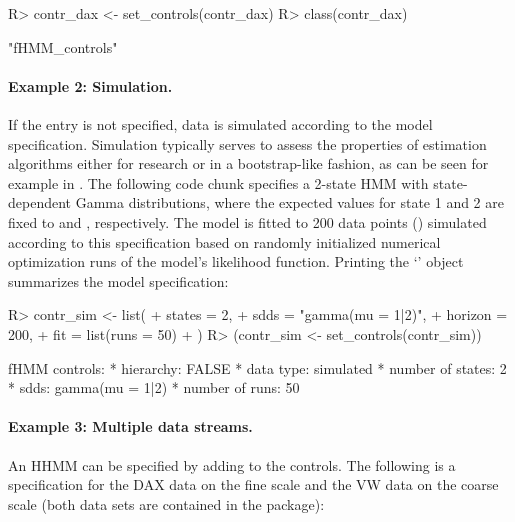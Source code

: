\documentclass[article]{jss}
\newcommand{\class}[1]{`\code{#1}'}
\begin{document}
%
\begin{Schunk}
\begin{Sinput}
R> contr_dax <- set_controls(contr_dax)
R> class(contr_dax)
\end{Sinput}
\begin{Soutput}
[1] "fHMM_controls"
\end{Soutput}
\end{Schunk}
%

\paragraph{Example 2: Simulation.} If the  entry is not specified, data is simulated according to the model specification. Simulation typically serves to assess the properties of estimation algorithms either for research or in a bootstrap-like fashion, as can be seen for example in \cite{oel19}. The following code chunk specifies a 2-state HMM with state-dependent Gamma distributions, where the expected values for state 1 and 2 are fixed to  and , respectively. The model is fitted to 200 data points () simulated according to this specification based on  randomly initialized numerical optimization runs of the model's likelihood function. Printing the \class{fHMM\_controls} object summarizes the model specification:

%
\begin{Schunk}
\begin{Sinput}
R> contr_sim <- list(
+    states  = 2,
+    sdds    = "gamma(mu = 1|2)",
+    horizon = 200,
+    fit     = list(runs = 50)
+  )
R> (contr_sim <- set_controls(contr_sim))
\end{Sinput}
\begin{Soutput}
fHMM controls:
* hierarchy: FALSE 
* data type: simulated 
* number of states: 2 
* sdds: gamma(mu = 1|2) 
* number of runs: 50  
\end{Soutput}
\end{Schunk}
%

\paragraph{Example 3: Multiple data streams.} An HHMM can be specified by adding  to the controls. The following is a specification for the DAX data on the fine scale and the VW data on the coarse scale (both data sets are contained in the  package): 
\end{document}
